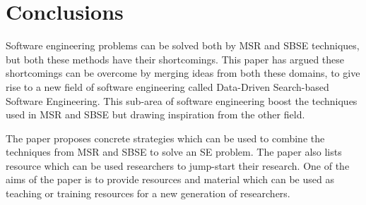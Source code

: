 \documentclass[table, xcdraw, sigconf,review, anonymous]{acmart}
\begin{document}
\section{Conclusions}
Software engineering problems can be solved both by MSR and SBSE techniques, but both these methods have their shortcomings. This paper has argued these shortcomings can be overcome by merging ideas from both these domains, to give rise to a new field of software engineering called Data-Driven Search-based Software Engineering. This sub-area of software engineering boost the techniques used in MSR and SBSE but drawing inspiration from the other field. 

The paper proposes concrete strategies which can be used to combine the techniques from MSR and SBSE to solve an SE problem. The paper also lists resource which can be used researchers to jump-start their research. One of the aims of the paper is to provide resources and material which can be used as teaching or training resources for a new generation of researchers. 

% 
% 


 
\end{document}
